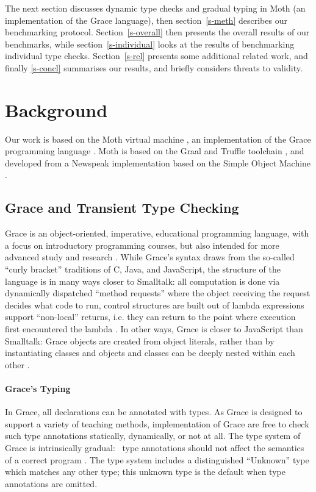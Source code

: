 \documentclass[sigplan,screen]{acmart}
\begin{document}
The next section discusses dynamic type checks and gradual typing in
Moth (an implementation of the Grace language), then section~\ref{s-meth} describes our benchmarking protocol. Section~\ref{s-overall} then presents the overall results of
our benchmarks, while section~\ref{s-individual}
looks at the results of benchmarking individual type checks.
Section~\ref{s-rel} presents some additional related work, and finally \ref{s-concl} summarises our results, and briefly considers threats to validity.

\section{Background}
\label{s-bg}

Our work is based on the Moth virtual machine 
\cite{Roberts2017,roberts-and-co-ecoop-2019},
an implementation
of the Grace programming language 
\citep{graceOnward12,graceSigcse13}.
Moth is based on the Graal and Truffle toolchain
\cite{Wurthinger:2017:PPE,Wurthinger2013},
and developed from a Newspeak implementation based on the  Simple
Object Machine \cite{Daloze2016,SOMns}.

\subsection{Grace and Transient Type Checking}

Grace is an object-oriented, imperative, educational programming
language, with a focus on introductory programming
courses, but also intended for more advanced study and research \citep{graceOnward12,graceSigcse13}.
%
While Grace's syntax draws
from the so-called ``curly bracket'' traditions of C, Java, and
JavaScript, the structure of the language
is in many ways closer to Smalltalk:
all computation is done via dynamically dispatched  ``method requests''
where the object receiving the request decides what code to run,
control structures are built out of lambda expressions support ``non-local'' returns, i.e. they can return to the point where execution first encountered the lambda \citep{bluebook}.  In
other ways, Grace is closer to JavaScript than Smalltalk: Grace
objects are created from object literals, rather than by
instantiating classes \citep{Black2007-emeraldHOPL,JonesECOOP2016} and
objects and classes can be deeply nested within each 
other \citep{betabook}.

\paragraph{Grace's Typing}
In Grace, all declarations can be annotated with types.
As Grace is designed to support a variety of teaching methods, implementation of Grace are free to check such type annotations  statically, dynamically, or not at all.
The type system of Grace is intrinsically gradual:%
%
~type annotations should not affect the semantics of a correct
program \citep{XXXSiek2015}. The type system
includes a distinguished ``{Unknown}'' type which matches any other type; this unknown type is the default when type annotations are omitted.
\end{document}
